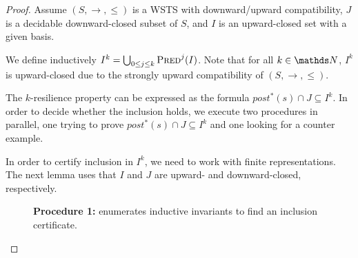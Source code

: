 \begin{proof}

Assume  $(S, \rightarrow, \leq)$ is a WSTS with downward/upward compatibility, $J$ is a decidable downward-closed subset of $S$, and $I$ is an upward-closed set with a given basis.

We define inductively
$I^{k} = \bigcup_{0 \leq j \leq k} \textsc{Pred}^j(I)$. Note that for all $k \in \N$, $I^k$ is upward-closed due to
the strongly upward compatibility of $(S, \rightarrow, \leq)$.


The $k$-resilience property can be expressed as the formula
$ post^*(s) \cap J \subseteq I^k$. In order to decide whether the inclusion holds, we execute two procedures in parallel, one trying to prove $ post^*(s)\cap J \subseteq I^k$ 
and one looking for a counter example.

In order to certify inclusion in $I^k$, we need to work with finite representations.
The next lemma uses that $I$ and $J$ are upward- and downward-closed, respectively.









\begin{figure}
	\caption{\textbf{Procedure 1:} enumerates inductive invariants to find an inclusion certificate.}\label{procedure1}
\end{figure}





\end{proof}
